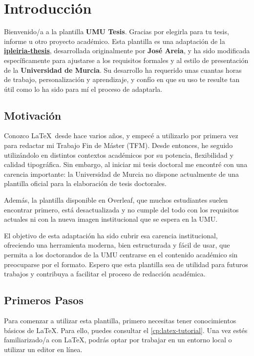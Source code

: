 \chapter[Introducción]{Introducción}
\label{cp:introduction}

\parindent0pt

Bienvenido/a a la plantilla \textcolor{maincolor}{\textbf{UMU Tesis}}. Gracias por elegirla para tu tesis, informe u otro proyecto académico. Esta plantilla es una adaptación de la \textbf{\href{https://github.com/joseareia/ipleiria-thesis}{ipleiria-thesis}}, desarrollada originalmente por \textbf{José Areia}, y ha sido modificada específicamente para ajustarse a los requisitos formales y al estilo de presentación de la \textbf{Universidad de Murcia}. Su desarrollo ha requerido unas cuantas horas de trabajo, personalización y aprendizaje, y confío en que su uso te resulte tan útil como lo ha sido para mí el proceso de adaptarla.

\section{Motivación}
Conozco \LaTeX~desde hace varios años, y empecé a utilizarlo por primera vez para redactar mi Trabajo Fin de Máster (TFM). Desde entonces, he seguido utilizándolo en distintos contextos académicos por su potencia, flexibilidad y calidad tipográfica. Sin embargo, al iniciar mi tesis doctoral me encontré con una carencia importante: la Universidad de Murcia no dispone actualmente de una plantilla oficial para la elaboración de tesis doctorales.

Además, la plantilla disponible en Overleaf, que muchos estudiantes suelen encontrar primero, está desactualizada y no cumple del todo con los requisitos actuales ni con la nueva imagen institucional que se espera en la UMU. 

El objetivo de esta adaptación ha sido cubrir esa carencia institucional, ofreciendo una herramienta moderna, bien estructurada y fácil de usar, que permita a los doctorandos de la UMU centrarse en el contenido académico sin preocuparse por el formato. Espero que esta plantilla sea de utilidad para futuros trabajos y contribuya a facilitar el proceso de redacción académica.

\section{Primeros Pasos}

Para comenzar a utilizar esta plantilla, primero necesitas tener conocimientos básicos de \LaTeX. Para ello, puedes consultar el \autoref{cp:latex-tutorial}. Una vez estés familiarizado/a con \LaTeX, podrás optar por trabajar en un entorno local o utilizar un editor en línea.

